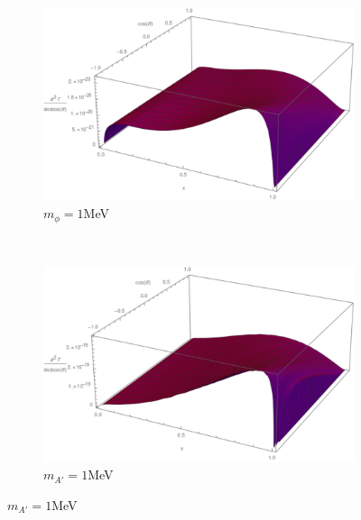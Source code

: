 \begin{figure}[H]
	\centering
	\begin{subfigure}[b]{0.45\textwidth}
    \includegraphics[width=\textwidth]{imgs/S0-001}
    \caption{$m_\phi = 1$MeV}
    \end{subfigure}
    ~
    \begin{subfigure}[b]{0.45\textwidth}
    \includegraphics[width=\textwidth]{imgs/V0-001}
    \caption{$m_{A'} = 1$MeV}
    \end{subfigure}
    

\end{figure}
